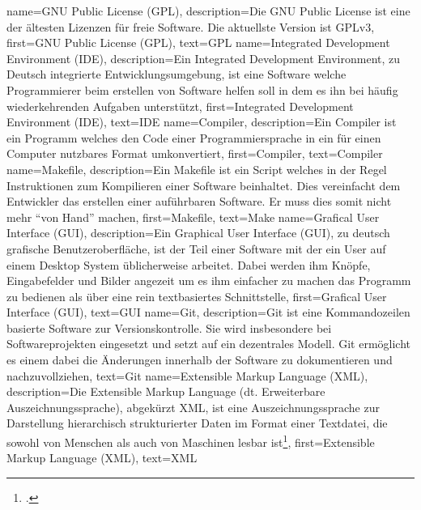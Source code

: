 {
    name={GNU Public License (GPL)},
    description={Die GNU Public License ist eine der ältesten Lizenzen für
      freie Software. Die aktuellste Version ist GPLv3},
    first={GNU Public License (GPL)},
    text={GPL}
}
{
    name={Integrated Development Environment (IDE)},
    description={Ein Integrated Development Environment, zu Deutsch integrierte
        Entwicklungsumgebung, ist eine Software welche Programmierer beim
        erstellen von Software helfen soll in dem es ihn bei häufig
        wiederkehrenden Aufgaben unterstützt},
    first={Integrated Development Environment (IDE)},
    text={IDE}
}
{
    name={Compiler},
    description={Ein Compiler ist ein Programm welches den Code einer
      Programmiersprache in ein für einen Computer nutzbares Format
      umkonvertiert},
    first={Compiler},
    text={Compiler}
}
{
    name={Makefile},
    description={Ein Makefile ist ein Script welches in der Regel Instruktionen
    zum Kompilieren einer Software beinhaltet. Dies vereinfacht dem Entwickler
    das erstellen einer auführbaren Software. Er muss dies somit nicht mehr
    ``von Hand'' machen\pagebreak},
    first={Makefile},
    text={Make}
}
{
    name={Grafical User Interface (GUI)},
    description={Ein Graphical User Interface (GUI), zu deutsch grafische
      Benutzeroberfläche, ist der Teil einer Software mit der ein User auf
      einem Desktop System üblicherweise arbeitet. Dabei werden ihm Knöpfe,
      Eingabefelder und Bilder angezeit um es ihm einfacher zu machen das
      Programm zu bedienen als über eine rein textbasiertes Schnittstelle},
    first={Grafical User Interface (GUI)},
    text={GUI}
}
{
    name={Git},
    description={Git ist eine Kommandozeilen basierte Software zur
      Versionskontrolle. Sie wird insbesondere bei Softwareprojekten eingesetzt
    und setzt auf ein dezentrales Modell. Git ermöglicht es einem dabei die
    Änderungen innerhalb der Software zu dokumentieren und nachzuvollziehen},
    text={Git}
}
{
    name={Extensible Markup Language (XML)},
    description={Die Extensible Markup Language (dt. Erweiterbare
      Auszeichnungssprache), abgekürzt XML, ist eine Auszeichnungssprache zur
      Darstellung hierarchisch strukturierter Daten im Format einer Textdatei, die
      sowohl von Menschen als auch von Maschinen lesbar ist\footcite{xml}},
    first={Extensible Markup Language (XML)},
    text={XML}
}
